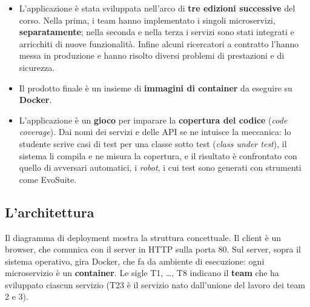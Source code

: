 \begin{itemize}
  \item L'applicazione è stata sviluppata nell'arco di \textbf{tre edizioni successive} del corso. Nella prima, i team
        hanno implementato i singoli microservizi, \textbf{separatamente}; nella seconda e nella terza i servizi sono stati
        integrati e arricchiti di nuove funzionalità. Infine alcuni ricercatori a contratto l'hanno messa in produzione e
        hanno risolto diversi problemi di prestazioni e di sicurezza.
  \item Il prodotto finale è un insieme di \textbf{immagini di container} da eseguire su \textbf{Docker}.
  \item L'applicazione è un \textbf{gioco} per imparare la \textbf{copertura del codice} (\textit{code coverage}). Dai nomi
        dei servizi e delle API se ne intuisce la meccanica: lo studente scrive casi di test per una classe sotto test
        (\textit{class under test}), il sistema li compila e ne misura la copertura, e il risultato è confrontato con
        quello di avversari automatici, i \textit{robot}, i cui test sono generati con strumenti come EvoSuite.
\end{itemize}

\subsection{L'architettura}

Il diagramma di deployment mostra la struttura concettuale. Il client è un browser, che comunica con il server in HTTP
sulla porta 80. Sul server, sopra il sistema operativo, gira Docker, che fa da ambiente di esecuzione: ogni microservizio
è un \textbf{container}. Le sigle T1, \ldots, T8 indicano il \textbf{team} che ha sviluppato ciascun servizio (T23 è il
servizio nato dall'unione del lavoro dei team 2 e 3).

